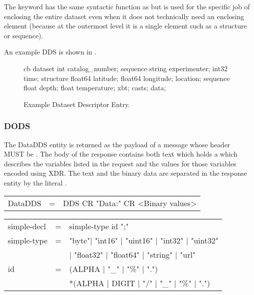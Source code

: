 \documentclass[justify]{dods-paper}
\begin{document}
The  keyword has the same syntactic function as
 but is used for the specific job of enclosing the entire
dataset even when it does not technically need an enclosing element (because
at the outermost level it is a single element such as a structure or
sequence).

An example DDS is shown in .

\begin{figure}
\begin{vcode}{cb}
dataset {
   int catalog_number;
   sequence {
      string experimenter;
      int32 time;
      structure {
         float64 latitude;
         float64 longitude;
      } location;
      sequence {
         float depth;
         float temperature;
      } xbt;
   } casts;
} data;
\end{vcode}
\caption{Example Dataset Descriptor Entry.}
\label{fig-dds}
\end{figure}


\subsubsection{DODS}
\label{sec-dods}

The \ac{DataDDS} entity is returned as the payload of a message whose
 header MUST be .  The body
of the response contains both text which holds a \DDS which describes
the variables listed in the request and the values for those variables
encoded using XDR\cite{xdr}. The text \DDS and the binary data are
separated in the response entity by the literal .

\begin{ttfamily}
\begin{center}
\begin{tabular}{lll}
DataDDS & = & DDS CR "Data:" CR <Binary values>
\end{tabular}
\end{center}
\end{ttfamily}

\begin{ttfamily}
\begin{center}
\begin{tabular}{lll}
simple-decl & = & simple-type id ";" \\
simple-type & = & "byte"| "int16" | "uint16" | "int32" | "uint32" \\
                & & | "float32" | "float64" | "string" | "url" \\
id & = & (ALPHA | "\_" | "\%" | ".") \\
       & & *(ALPHA | DIGIT | "/" | "\_" | "\%" | ".") \\
\end{tabular}
\end{center}
\end{ttfamily}
\end{document}
